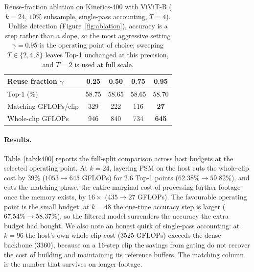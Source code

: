 \begin{table}[t]
\centering
\footnotesize
\setlength{\tabcolsep}{5pt}
\begin{tabular}{lcccc}
\toprule
Reuse fraction $\gamma$ & 0.25 & 0.50 & 0.75 & 0.95 \\
\midrule
Top-1 (\%)              & 58.75 & 58.65 & 58.65 & 58.70 \\
Matching GFLOPs/clip    & 329   & 222   & 116   & \textbf{27} \\
Whole-clip GFLOPs       & 946   & 840   & 734   & \textbf{645} \\
\bottomrule
\end{tabular}
\caption{Reuse-fraction ablation on Kinetics-400 with ViViT-B ($k = 24$,
$10\%$ subsample, single-pass accounting, $T = 4$). Unlike detection
(Figure~\ref{fig:ablation}), accuracy is a step rather than a slope, so
the most aggressive setting $\gamma = 0.95$ is the operating point of
choice; sweeping $T \in \{2, 4, 8\}$ leaves Top-1 unchanged at this
precision, and $T = 2$ is used at full scale.}
\label{tab:k400-ablation}
\end{table}

\paragraph{Results.}
Table~\ref{tab:k400} reports the full-split comparison across host
budgets at the selected operating point. At $k = 24$, layering PSM on
the host cuts the whole-clip cost by $39\%$ ($1053 \rightarrow 645$
GFLOPs) for $2.6$ Top-1 points ($62.38\% \rightarrow 59.82\%$), and cuts
the matching phase, the entire marginal cost of processing further
footage once the memory exists, by $16\times$
($435 \rightarrow 27$ GFLOPs). The favourable operating point is the
small budget: at $k = 48$ the one-time accuracy step is larger
($67.54\% \rightarrow 58.37\%$), so the filtered model surrenders the
accuracy the extra budget had bought.
We also note an honest quirk of single-pass accounting: at $k = 96$ the
host's own whole-clip cost ($3525$ GFLOPs) exceeds the dense backbone
($3360$), because on a 16-step clip the savings from gating do not
recover the cost of building and maintaining its reference buffers. The
matching column is the number that survives on longer footage.

